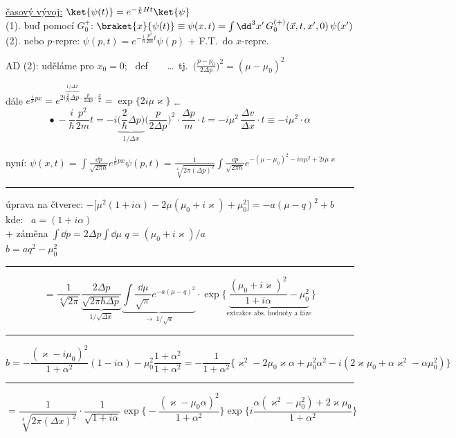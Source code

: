 \underline{časový vývoj:} \quad $\ket{\psi(t)} = e^{-\frac{i}{\hbar}Ht}\ket{\psi}$ \\
(1). buď pomocí $G_0^+$: \quad $\braket{x}{\psi(t)} \equiv \psi(x,t) = \int\dd^3x'\,G_0^{(+)}(\vec x,t,x',0)\,\psi(x')$ \\
(2). nebo $p$-repre: \quad $\psi(p,t) = e^{-\frac{i}{\hbar}\frac{p^2}{2m}t}\psi(p)$ \quad + F.T.\ do $x$-repre. \\

AD (2): uděláme pro $x_0 = 0$; \ def \  \  \quad \dots\ tj.\ $\big(\frac{p-p_0}{2\Delta p}\big)^2 = (\mu-\mu_0)^2$

dále \quad $e^{\frac{i}{\hbar}px} = e^{2i\overbrace{\scriptstyle\frac{2}{\hbar}\Delta p}^{1/\Delta x}\cdot\frac{p}{2\Delta p}\cdot\frac{x}{2}} = \exp\{2i\mu\varkappa\}$ \quad \dots\ 
\[
  \bullet\ -\frac{i}{\hbar}\frac{p^2}{2m}t = -i\underbrace{\Big(\frac{2}{\hbar}\Delta p\Big)}_{1/\Delta x}\Big(\frac{p}{2\Delta p}\Big)^2\cdot\frac{\Delta p}{m}\cdot t
  = -i\mu^2\,\boxed{\frac{\Delta v}{\Delta x}\cdot t} \equiv -i\mu^2\cdot\alpha
\]

nyní: \quad
$\displaystyle\psi(x,t) = \int\frac{\dd p}{\sqrt{2\pi\hbar}}e^{\frac{i}{\hbar}px}\psi(p,t)
 = \frac{1}{\sqrt[4]{2\pi(\Delta p)^2}}\int\frac{\dd p}{\sqrt{2\pi\hbar}}e^{-(\mu-\mu_0)^2 - i\alpha\mu^2 + 2i\mu\varkappa}$

\noindent\rule{\linewidth}{0.3pt}
úprava na čtverec: \quad $-\big[\mu^2(1+i\alpha) - 2\mu(\mu_0+i\varkappa) + \mu_0^2\big] = -a(\mu-q)^2 + b$ \\
\hspace*{7.5cm} kde: \ $a = (1+i\alpha)$ \\
+ záměna $\int\dd p = 2\Delta p\int\dd\mu$ \hspace{3.3cm} $q = (\mu_0+i\varkappa)/a$ \\
\hspace*{8.2cm} $b = aq^2 - \mu_0^2$ \\
\noindent\rule{\linewidth}{0.3pt}
\[
  = \frac{1}{\sqrt[4]{2\pi}}\underbrace{\frac{2\Delta p}{\sqrt{2\pi\hbar\Delta p}}}_{1/\sqrt{\Delta x}}
  \underbrace{\int\frac{\dd\mu}{\sqrt\pi}e^{-a(\mu-q)^2}}_{\to\ 1/\sqrt a}\cdot
  \exp\Big\{\underbrace{\frac{(\mu_0+i\varkappa)^2}{1+i\alpha} - \mu_0^2}_{\text{extrakce abs.\ hodnoty a fáze}}\Big\}
\]
\noindent\rule{\linewidth}{0.3pt}
$b = -\dfrac{(\varkappa-i\mu_0)^2}{1+\alpha^2}(1-i\alpha) - \mu_0^2\dfrac{1+\alpha^2}{1+\alpha^2}
 = -\dfrac{1}{1+\alpha^2}\big\{\varkappa^2 - 2\mu_0\varkappa\alpha + \mu_0^2\alpha^2 - i(2\varkappa\mu_0 + \alpha\varkappa^2 - \alpha\mu_0^2)\big\}$ \\
\noindent\rule{0.75\linewidth}{0.3pt}
\[
  = \frac{1}{\sqrt[4]{2\pi(\Delta x)^2}}\cdot\frac{1}{\sqrt{1+i\alpha}}\exp\Big\{-\frac{(\varkappa-\mu_0\alpha)^2}{1+\alpha^2}\Big\}
  \exp\Big\{i\frac{\alpha(\varkappa^2-\mu_0^2) + 2\varkappa\mu_0}{1+\alpha^2}\Big\}
\]


